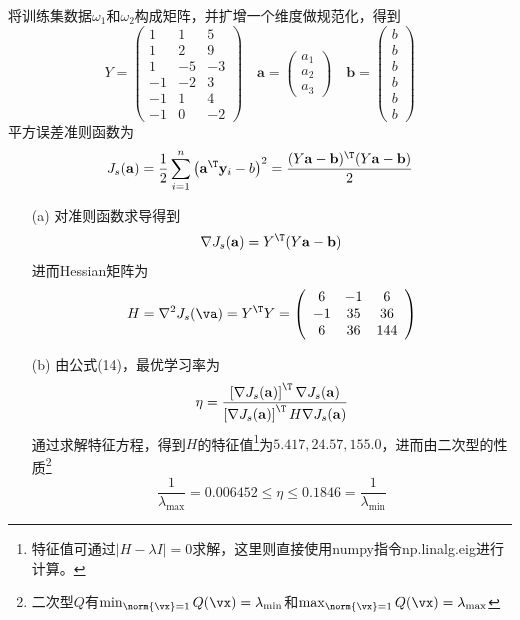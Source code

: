 \documentclass[reportComp]{thesis}
\begin{document}
\begin{answer}
将训练集数据$\omega_1$和$\omega_2$构成矩阵，并扩增一个维度做规范化，得到
\[Y =\left(\begin{array}{rrr}{1} & {1} & {5} \\ {1} & {2} & {9} \\ {1} & {-5} & {-3} \\ {-1} & {-2} & {3} \\ {-1} & {1} & {4} \\ {-1} & {0} & {-2}\end{array}\right) \quad \mathbf{a}=\left(\begin{array}{r}{a_{1}} \\ {a_{2}} \\ {a_{3}}\end{array}\right) \quad \mathbf{b}=\left(\begin{array}{c}{b} \\ {b} \\ {b} \\ {b} \\ {b} \\ {b}\end{array}\right)\]
平方误差准则函数为
\[J_{s}(\mathbf{a})=\frac{1}{2} \sum_{i=1}^{n}\left(\mathbf{a}^\T  \mathbf{y}_{i}-b\right)^{2}=\frac{(Y  \mathbf{a}-\mathbf{b})^\T (Y  \mathbf{a}-\mathbf{b})}{2}\]
\begin{itemize}
	\item [(a)] 对准则函数求导得到
	\[\nabla J_{s}(\mathbf{a})=Y^\T (Y  \mathbf{a}-\mathbf{b})\]
	进而Hessian矩阵为
	\[H =\nabla^2 J_s(\va)=Y ^\T  Y =\left(\begin{array}{ccc}{6} & {-1} & {6} \\ {-1} & {35} & {36} \\ {6} & {36} & {144}\end{array}\right)\]
	\item [(b)] 由公式(14)，最优学习率为
	\[\eta=\frac{\left[\nabla J_{s}(\mathbf{a})\right]^\T  \nabla J_{s}(\mathbf{a})}{\left[\nabla J_{s}(\mathbf{a})\right]^\T  H  \nabla J_{s}(\mathbf{a})}\]
	通过求解特征方程，得到$H$的特征值\footnote{特征值可通过$|H-\lambda I|=0$求解，这里则直接使用numpy指令np.linalg.eig进行计算。}为$5.417,24.57,155.0$，进而由二次型的性质\footnote{二次型$Q$有$\min_{\norm{\vx}=1}Q(\vx)=\lambda_{\min}$和$\max_{\norm{\vx}=1}Q(\vx)=\lambda_{\max}$}
	\[\frac{1}{\lambda_{\max}}=0.006452\leq\eta\leq 0.1846=\frac{1}{\lambda_{\min}}\]
\end{itemize}
\end{answer}
\end{document}
